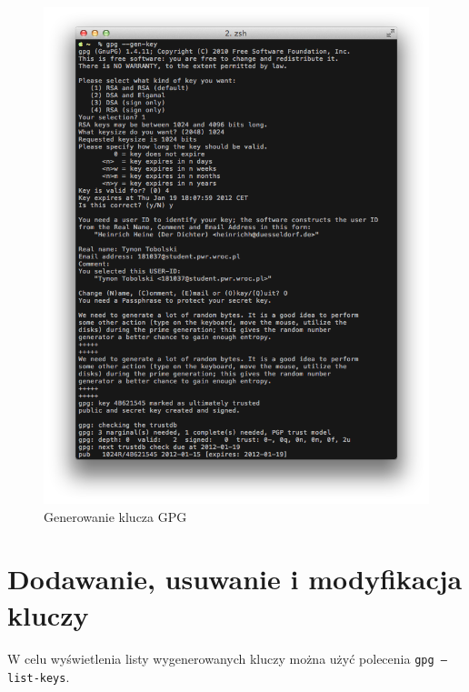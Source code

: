\documentclass[wide,a4paper,titlepage,12pt] {article}
\begin{document}
  \begin{figure}[h!]
    \begin{center}
      \includegraphics[width=\textwidth]{img/1.png}
      \caption{Generowanie klucza GPG}
    \end{center}
  \end{figure}

  \newpage
  \paragraph{}
  \newpage

  \section{Dodawanie, usuwanie i modyfikacja kluczy}
  \paragraph{}
  W celu wyświetlenia listy wygenerowanych kluczy można użyć polecenia \texttt{gpg --list-keys}.
\end{document}
